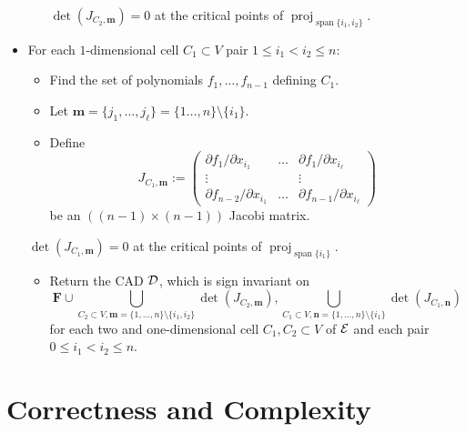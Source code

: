 \documentclass[
]{book}
\providecommand{\tightlist}{%
  \setlength{\itemsep}{0pt}\setlength{\parskip}{0pt}}
\theoremstyle{definition}
\theoremstyle{definition}
\theoremstyle{definition}
\theoremstyle{definition}
\theoremstyle{remark}
\begin{document}
\begin{itemize}
\begin{itemize}
    \(\det(J_{C_2,\mathbf{m}}) = 0\) at the critical points of \({\operatorname{proj}_{{\operatorname{span} \{i_1,i_2\}}}}\).
  \end{itemize}
\item
  For each \(1\)-dimensional cell \(C_1 \subset V\) pair \(1 \le i_1 < i_2 \le n\):

  \begin{itemize}
  \item
    Find the set of polynomials \(f_1,\ldots,f_{n-1}\) defining \(C_1\).
  \item
    Let \(\mathbf{m} = \{j_1,\ldots,j_\ell\} = \{1\ldots,n\} \setminus \{i_1\}\).
  \item
    Define
    \begin{equation}
    J_{C_1,\mathbf{m}} :=
    \begin{pmatrix}\partial f_{1}/\partial x_{i_{1}} & \ldots & \partial f_{1}/\partial x_{i_{\ell}}\\
    \vdots &  & \vdots\\
    \partial f_{n-2}/\partial x_{i_{1}} & \ldots & \partial f_{n-1}/\partial x_{i_{\ell}}
    \end{pmatrix}
    \label{eq:jacobi-one}
    \end{equation}
    be an \(((n-1)\times (n-1))\) Jacobi matrix.
  \end{itemize}

  \(\det(J_{C_1,\mathbf{m}}) = 0\) at the critical points of \({\operatorname{proj}_{{\operatorname{span} \{i_1\}}}}\).

  \begin{itemize}
  \tightlist
  \item
    Return the CAD \(\cal D\), which is sign invariant on
    \[
    \mathbf{F} \cup
    \bigcup_{C_2 \subset V,\mathbf{m} = \{1,\ldots,n\} \setminus \{i_1,i_2\}} \det\left(J_{C_2,\mathbf{m}}\right),
    \bigcup_{C_1 \subset V,\mathbf{n} = \{1,\ldots,n\} \setminus \{i_1\}} \det\left(J_{C_1,\mathbf{n}}\right)
    \]
    for each two and one-dimensional cell \(C_1,C_2 \subset V\) of \(\cal E\) and each pair \(0\le i_1 < i_2 \le n\).
  \end{itemize}
\end{itemize}

\hypertarget{correctness-and-complexity}{%
\section{Correctness and Complexity}\label{correctness-and-complexity}}
\end{document}
